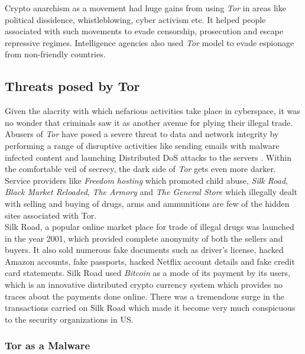\documentclass[letterpaper, 10 pt, conference]{ieeeconf}
\begin{document}
Crypto anarchism as a movement had huge gains from using \textit{Tor} in areas like political dissidence, whistleblowing, cyber activism etc. It helped people associated with such movements to evade censorship, prosecution and escape repressive regimes. Intelligence agencies also used \textit{Tor} model to evade espionage from non-friendly countries.\\

\subsection{Threats posed by Tor}

Given the alacrity with which nefarious activities take place in cyberspace, it was no wonder that criminals saw it as another avenue for plying their illegal trade. Abusers of \textit{Tor} have posed a severe threat to data and network integrity by performing a range of disruptive activities like sending emails with malware infected content and launching Distributed DoS attacks to the servers . Within the comfortable veil of secrecy, the dark side of \textit{Tor} gets even more darker.\\

Service providers like \textit{Freedom hosting} which promoted child abuse, \textit{Silk Road}, \textit{Black Market Reloaded}, \textit{The Armory} and \textit{The General Store} which illegally dealt with selling and buying of drugs, arms and ammunitions are few of the hidden sites associated with Tor.\\

Silk Road, a popular online market place for trade of illegal drugs was launched in the year 2001, which provided complete anonymity of both the sellers and buyers. It also sold numerous fake documents such as driver's license, hacked Amazon accounts, fake passports, hacked Netflix account details and fake credit card statements. Silk Road used \textit{Bitcoin} as a mode of its payment by its users, which is an innovative distributed crypto currency system which provides no traces about the payments done online. There was a tremendous surge in the transactions carried on Silk Road which made it become very much conspicuous to the security organizations in US.\\

\subsubsection{Tor as a Malware}
\end{document}
